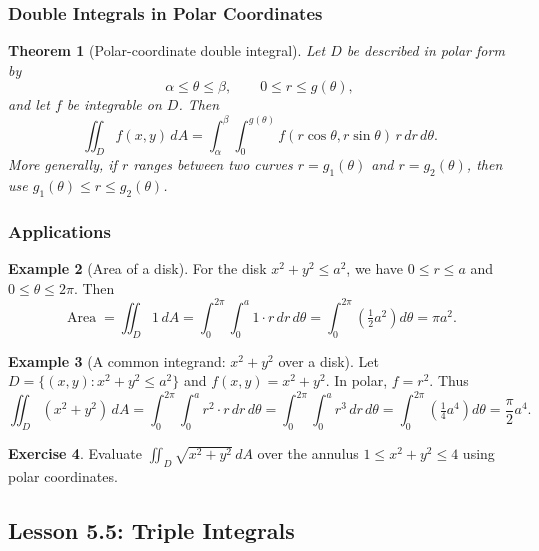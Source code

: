 \documentclass[12pt]{article}
\numberwithin{equation}{section}
\theoremstyle{plain}
\newtheorem{theorem}{Theorem}[section]
\theoremstyle{definition}
\newtheorem{example}[theorem]{Example}
\newtheorem{exercise}[theorem]{Exercise}
\theoremstyle{remark}
\begin{document}
\subsubsection{Double Integrals in Polar Coordinates}

\begin{theorem}[Polar-coordinate double integral]\label{thm:polar-double}
Let $D$ be described in polar form by
\[
\alpha\le \theta\le \beta,\qquad 0\le r\le g(\theta),
\]
and let $f$ be integrable on $D$. Then
\begin{equation}\label{eq:polar-double}
\iint_D f(x,y)\,dA
=
\int_{\alpha}^{\beta}\int_{0}^{g(\theta)}
f(r\cos\theta,r\sin\theta)\, r\,dr\,d\theta.
\end{equation}
More generally, if $r$ ranges between two curves $r=g_1(\theta)$ and $r=g_2(\theta)$, then use $g_1(\theta)\le r\le g_2(\theta)$.
\end{theorem}

\subsubsection{Applications}

\begin{example}[Area of a disk]\label{ex:area-disk}
For the disk $x^2+y^2\le a^2$, we have $0\le r\le a$ and $0\le\theta\le 2\pi$.
Then
\[
\operatorname{Area}=\iint_D 1\,dA
=\int_{0}^{2\pi}\int_{0}^{a} 1\cdot r\,dr\,d\theta
=\int_{0}^{2\pi}\left(\tfrac12 a^2\right)d\theta
=\pi a^2.
\]
\end{example}

\begin{example}[A common integrand: $x^2+y^2$ over a disk]
Let $D=\{(x,y):x^2+y^2\le a^2\}$ and $f(x,y)=x^2+y^2$.
In polar, $f=r^2$. Thus
\[
\iint_D (x^2+y^2)\,dA
=\int_{0}^{2\pi}\int_{0}^{a} r^2\cdot r\,dr\,d\theta
=\int_{0}^{2\pi}\int_{0}^{a} r^3\,dr\,d\theta
=\int_{0}^{2\pi}\left(\tfrac14 a^4\right)d\theta
=\frac{\pi}{2}a^4.
\]
\end{example}

\begin{exercise}
Evaluate $\iint_D \sqrt{x^2+y^2}\,dA$ over the annulus $1\le x^2+y^2\le 4$ using polar coordinates.
\end{exercise}

\subsection{Lesson 5.5: Triple Integrals}
\end{document}
